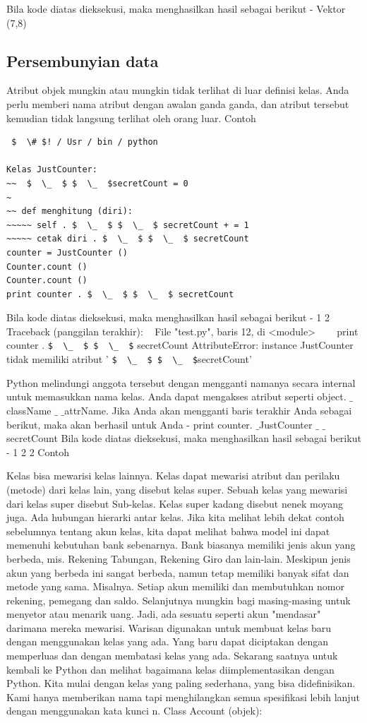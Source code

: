 Bila kode diatas dieksekusi, maka menghasilkan hasil sebagai berikut -
Vektor (7,8)

\subsection{Persembunyian data}
Atribut objek mungkin atau mungkin tidak terlihat di luar definisi kelas. Anda perlu memberi nama atribut dengan awalan ganda ganda, dan atribut tersebut kemudian tidak langsung terlihat oleh orang luar.
Contoh

\begin {verbatim}
 $  \# $! / Usr / bin / python

Kelas JustCounter:
~~  $  \_  $ $  \_  $secretCount = 0
~
~~ def menghitung (diri):
~~~~~ self . $  \_  $ $  \_  $ secretCount + = 1
~~~~~ cetak diri . $  \_  $ $  \_  $ secretCount
counter = JustCounter ()
Counter.count ()
Counter.count ()
print counter . $  \_  $ $  \_  $ secretCount
\end{verbatim}

Bila kode diatas dieksekusi, maka menghasilkan hasil sebagai berikut -
1
2
Traceback (panggilan terakhir):
~ File "test.py", baris 12, di <module>
~~~ print counter . \verb|$  \_  $ $  \_  $| secretCount
AttributeError: instance JustCounter tidak memiliki atribut ' \verb|$  \_  $ $  \_  $|secretCount'

Python melindungi anggota tersebut dengan mengganti namanya secara internal untuk memasukkan nama kelas. Anda dapat mengakses atribut seperti object. $  \_  $className $  \_  $ $  \_  $attrName. Jika Anda akan mengganti baris terakhir Anda sebagai berikut, maka akan berhasil untuk Anda -
print counter. $  \_  $JustCounter $  \_  $ $  \_  $secretCount
Bila kode diatas dieksekusi, maka menghasilkan hasil sebagai berikut -
1
2
2
Contoh

Kelas bisa mewarisi kelas lainnya. Kelas dapat mewarisi atribut dan perilaku (metode) dari kelas lain, yang disebut kelas super. Sebuah kelas yang mewarisi dari kelas super disebut Sub-kelas. Kelas super kadang disebut nenek moyang juga. Ada hubungan hierarki antar kelas. Jika kita melihat lebih dekat contoh sebelumnya tentang akun kelas, kita dapat melihat bahwa model ini dapat memenuhi kebutuhan bank sebenarnya. Bank biasanya memiliki jenis akun yang berbeda, mis. Rekening Tabungan, Rekening Giro dan lain-lain. Meskipun jenis akun yang berbeda ini sangat berbeda, namun tetap memiliki banyak sifat dan metode yang sama. Misalnya. Setiap akun memiliki dan membutuhkan nomor rekening, pemegang dan saldo. Selanjutnya mungkin bagi masing-masing untuk menyetor atau menarik uang.
Jadi, ada sesuatu seperti akun "mendasar" darimana mereka mewarisi. Warisan digunakan untuk membuat kelas baru dengan menggunakan kelas yang ada. Yang baru dapat diciptakan dengan memperluas dan dengan membatasi kelas yang ada.
Sekarang saatnya untuk kembali ke Python dan melihat bagaimana kelas diimplementasikan dengan Python. Kita mulai dengan kelas yang paling sederhana, yang bisa didefinisikan. Kami hanya memberikan nama tapi menghilangkan semua spesifikasi lebih lanjut dengan menggunakan kata kunci n.
Class Account (objek):

